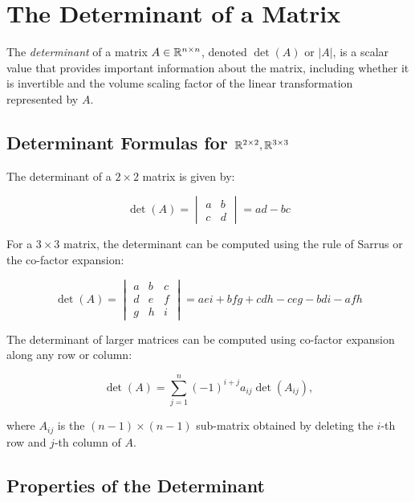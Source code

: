\chapter{The Determinant of a Matrix}

The \emph{determinant} of a matrix \(A \in \mathbb{R}^{n \times n}\), denoted \(\det(A)\) or \(|A|\), is a
scalar value that provides important information about the matrix, including whether it is
invertible and the volume scaling factor of the linear transformation represented by \(A\).

\section{Determinant Formulas for \texorpdfstring{\(\mathbb{R}^{2 \times 2}, \mathbb{R}^{3 \times 3}\)}{}}

The determinant of a \(2 \times 2\) matrix is given by:

\[
    \det(A) =
    \begin{vmatrix}
        a & b \\
        c & d
    \end{vmatrix}
    = ad - bc
\]

For a \(3 \times 3\) matrix, the determinant can be computed using the rule of Sarrus or the co-factor expansion:

\[
    \det(A) =
    \begin{vmatrix}
        a & b & c \\
        d & e & f \\
        g & h & i
    \end{vmatrix}
    = aei + bfg + cdh - ceg - bdi - afh
\]

The determinant of larger matrices can be computed using co-factor expansion along any row or column:

\[
    \det(A) = \sum_{j=1}^{n} {(-1)}^{i+j} a_{ij} \det(A_{ij}),
\]

where \(A_{ij}\) is the \((n-1) \times (n-1)\) sub-matrix obtained by deleting the \(i\)-th row and \(j\)-th column of \(A\).

\section{Properties of the Determinant}


